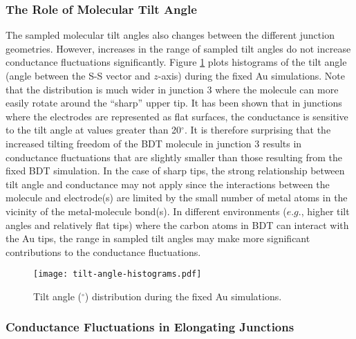 \documentclass[10pt]{report}  %
\newcommand\findent{\hspace*{\parindent}}
\newcommand{\degree}{\ensuremath{^\circ}}
\begin{document}
\subsubsection{The Role of Molecular Tilt Angle}

\findent The sampled molecular tilt angles also changes between the different junction geometries. However, increases in the range of sampled tilt angles do not increase conductance fluctuations significantly. Figure \ref{fig:tilt-angle-histograms} plots histograms of the tilt angle (angle between the S-S vector and $z$-axis) during the fixed Au simulations. Note that the distribution is much wider in junction 3 where the molecule can more easily rotate around the ``sharp'' upper tip. It has been shown that in junctions where the electrodes are represented as flat surfaces, the conductance is sensitive to the tilt angle at values greater than 20$\degree$. \cite{Haiss:2008} It is therefore surprising that the increased tilting freedom of the BDT molecule in junction 3 results in conductance fluctuations that are slightly smaller than those resulting from the fixed BDT simulation.  In the case of sharp tips, the strong relationship between tilt angle and conductance may not apply since the interactions between the molecule and electrode(s) are limited by the small number of metal atoms in the vicinity of the metal-molecule bond(s). In different environments ($e.g.$, higher tilt angles and relatively flat tips) where the carbon atoms in BDT can interact with the Au tips, the range in sampled tilt angles may make more significant contributions to the conductance fluctuations.

\begin{figure}[h!]
	\centering
	\texttt{[image: tilt-angle-histograms.pdf]}
	\caption{Tilt angle ($\degree$) distribution during the fixed Au simulations. }
	\label{fig:tilt-angle-histograms}
\end{figure}

\subsubsection{Conductance Fluctuations in Elongating Junctions}
\end{document}
